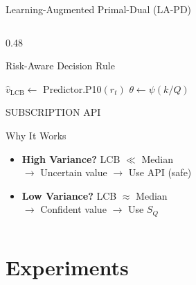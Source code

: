 \documentclass[aspectratio=169,10pt]{beamer}
\begin{document}
\begin{frame}{Learning-Augmented Primal-Dual (LA-PD)}
\begin{columns}[T]
    \begin{column}{0.48\textwidth}
        \begin{exampleblock}{Risk-Aware Decision Rule}
        \begin{algorithmic}[1]
        \STATE $\hat{v}_{\text{LCB}} \gets$ Predictor.P10$(r_t)$
        \STATE $\theta \gets \psi(k/Q)$ 

            \RETURN SUBSCRIPTION
        \ELSE
            \RETURN API
        \ENDIF
        \end{algorithmic}
        \end{exampleblock}

        \vspace{0.2cm}
        \begin{alertblock}{Why It Works}
        \begin{itemize}
            \item \textbf{High Variance?} LCB $\ll$ Median\\
            $\to$ Uncertain value $\to$ Use API (safe)
            \item \textbf{Low Variance?} LCB $\approx$ Median\\
            $\to$ Confident value $\to$ Use $S_Q$
        \end{itemize}
        \end{alertblock}
    \end{column}
\end{columns}
\end{frame}

\section{Experiments}
\end{document}
